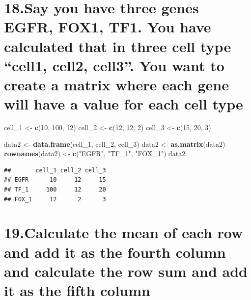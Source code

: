 \documentclass[]{article}
\newenvironment{Shaded}{\begin{snugshade}}{\end{snugshade}}
\newcommand{\DecValTok}[1]{\textcolor[rgb]{0.00,0.00,0.81}{#1}}
\newcommand{\KeywordTok}[1]{\textcolor[rgb]{0.13,0.29,0.53}{\textbf{#1}}}
\newcommand{\NormalTok}[1]{#1}
\newcommand{\StringTok}[1]{\textcolor[rgb]{0.31,0.60,0.02}{#1}}
\begin{document}
\hypertarget{say-you-have-three-genes-egfr-fox1-tf1.-you-have-calculated-that-in-three-cell-type-cell1-cell2-cell3.-you-want-to-create-a-matrix-where-each-gene-will-have-a-value-for-each-cell-type}{%
\section{18.Say you have three genes EGFR, FOX1, TF1. You have
calculated that in three cell type ``cell1, cell2, cell3''. You want to
create a matrix where each gene will have a value for each cell
type}\label{say-you-have-three-genes-egfr-fox1-tf1.-you-have-calculated-that-in-three-cell-type-cell1-cell2-cell3.-you-want-to-create-a-matrix-where-each-gene-will-have-a-value-for-each-cell-type}}

\begin{Shaded}
\begin{Highlighting}[]
\NormalTok{cell_}\DecValTok{1}\NormalTok{ <-}\StringTok{ }\KeywordTok{c}\NormalTok{(}\DecValTok{10}\NormalTok{, }\DecValTok{100}\NormalTok{, }\DecValTok{12}\NormalTok{)}
\NormalTok{cell_}\DecValTok{2}\NormalTok{ <-}\StringTok{ }\KeywordTok{c}\NormalTok{(}\DecValTok{12}\NormalTok{, }\DecValTok{12}\NormalTok{, }\DecValTok{2}\NormalTok{)}
\NormalTok{cell_}\DecValTok{3}\NormalTok{ <-}\StringTok{ }\KeywordTok{c}\NormalTok{(}\DecValTok{15}\NormalTok{, }\DecValTok{20}\NormalTok{, }\DecValTok{3}\NormalTok{)}

\NormalTok{data2 <-}\StringTok{ }\KeywordTok{data.frame}\NormalTok{(cell_}\DecValTok{1}\NormalTok{, cell_}\DecValTok{2}\NormalTok{, cell_}\DecValTok{3}\NormalTok{)}
\NormalTok{data2 <-}\StringTok{ }\KeywordTok{as.matrix}\NormalTok{(data2)}
\KeywordTok{rownames}\NormalTok{(data2) <-}\StringTok{ }\KeywordTok{c}\NormalTok{(}\StringTok{"EGFR"}\NormalTok{, }\StringTok{"TF_1"}\NormalTok{, }\StringTok{"FOX_1"}\NormalTok{)}
\NormalTok{data2}
\end{Highlighting}
\end{Shaded}

\begin{verbatim}
##       cell_1 cell_2 cell_3
## EGFR      10     12     15
## TF_1     100     12     20
## FOX_1     12      2      3
\end{verbatim}

\hypertarget{calculate-the-mean-of-each-row-and-add-it-as-the-fourth-column-and-calculate-the-row-sum-and-add-it-as-the-fifth-column}{%
\section{19.Calculate the mean of each row and add it as the fourth
column and calculate the row sum and add it as the fifth
column}\label{calculate-the-mean-of-each-row-and-add-it-as-the-fourth-column-and-calculate-the-row-sum-and-add-it-as-the-fifth-column}}
\end{document}
